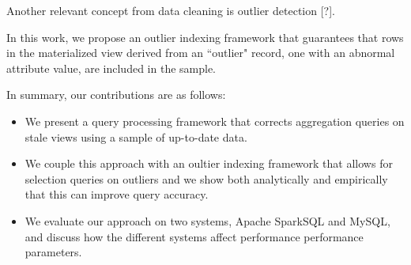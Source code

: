 Another relevant concept from data cleaning is outlier detection {[}?{]}.

In this work, we propose an outlier indexing framework that guarantees that
rows in the materialized view derived from an ``outlier" record, one with
an abnormal attribute value, are included in the sample.

In summary, our contributions are as follows:
\begin{itemize}
\item We present a query processing framework that corrects aggregation queries on stale
views using a sample of up-to-date data.
\item We couple this approach with an oultier indexing framework that allows
for selection queries on outliers and we show both analytically and empirically that 
this can improve query accuracy.
\item We evaluate our approach on two systems, Apache SparkSQL and MySQL,
and discuss how the different systems affect performance performance
parameters.
\end{itemize}
\fi
